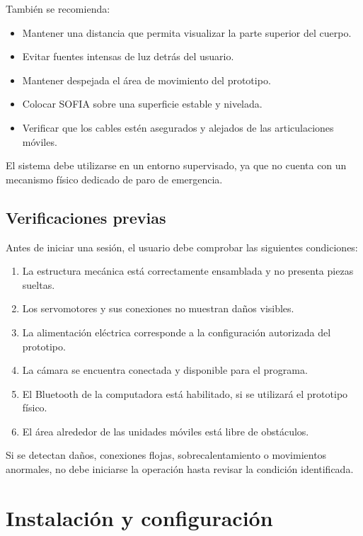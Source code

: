 \documentclass[letterpaper,journal]{IEEEtran}
\begin{document}
También se recomienda:

\begin{itemize}
    \item Mantener una distancia que permita visualizar
    la parte superior del cuerpo.
    \item Evitar fuentes intensas de luz detrás
    del usuario.
    \item Mantener despejada el área de movimiento
    del prototipo.
    \item Colocar SOFIA sobre una superficie
    estable y nivelada.
    \item Verificar que los cables estén asegurados
    y alejados de las articulaciones móviles.
\end{itemize}

El sistema debe utilizarse en un entorno supervisado,
ya que no cuenta con un mecanismo físico dedicado
de paro de emergencia.

\subsection{Verificaciones previas}

Antes de iniciar una sesión, el usuario debe
comprobar las siguientes condiciones:

\begin{enumerate}
    \item La estructura mecánica está correctamente
    ensamblada y no presenta piezas sueltas.
    \item Los servomotores y sus conexiones no
    muestran daños visibles.
    \item La alimentación eléctrica corresponde
    a la configuración autorizada del prototipo.
    \item La cámara se encuentra conectada
    y disponible para el programa.
    \item El Bluetooth de la computadora está
    habilitado, si se utilizará el prototipo físico.
    \item El área alrededor de las unidades
    móviles está libre de obstáculos.
\end{enumerate}

Si se detectan daños, conexiones flojas,
sobrecalentamiento o movimientos anormales,
no debe iniciarse la operación hasta revisar
la condición identificada.

\section{Instalación y configuración}
\label{sec:instalacion}
\end{document}
